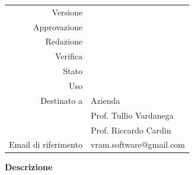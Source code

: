 \begin{titlepage}
\begin{center}
		\begin{tabular}{r | l} %
			Versione & \ver \\
			Approvazione & \app \\ %
			Redazione & \red \\
			Verifica & \test \\
			Stato & \stat \\
			Uso & \use \\
		    Destinato a & Azienda \\
						& Prof. Tullio Vardanega \\
						& Prof. Riccardo Cardin \\
			Email di riferimento& vram.software@gmail.com
		\end{tabular}
		\vfill
		\textbf{Descrizione} \\
		\DocDesc
	\end{center}
\end{titlepage}
\clearpage



